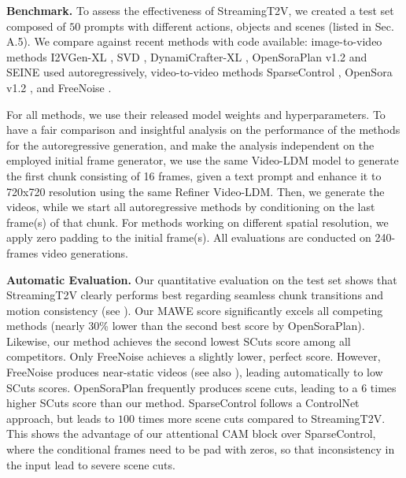 

\noindent\textbf{Benchmark.}
To assess the effectiveness of StreamingT2V, we created a test set composed of $50$ prompts with different actions, objects and scenes 
(listed in Sec. \textcolor{linkblue}{A.5}).
We compare against recent methods with code available: image-to-video methods I2VGen-XL  \cite{2023i2vgenxl}, SVD \cite{SVD}, DynamiCrafter-XL \cite{xing2023dynamicrafter}, OpenSoraPlan v1.2  \cite{opensoraplan} and SEINE \cite{chen2023seine} used autoregressively, video-to-video methods SparseControl  \cite{guo2023sparsectrl}, OpenSora v1.2 \cite{opensora}, and FreeNoise  \cite{qiu2023freenoise}.

For all methods, we use their released model weights and hyperparameters. 
To have a fair comparison and insightful analysis on the performance of the methods for the autoregressive generation, and make the analysis independent on the employed initial frame generator, we use the same Video-LDM model to generate the first chunk consisting of 16 frames, given a text prompt and enhance it to 720x720 resolution using the same Refiner Video-LDM.  
Then, we generate the videos, while we start all autoregressive methods by conditioning on the last frame(s) of that chunk. 
For methods working on different spatial resolution, we apply zero padding to the initial frame(s). All evaluations are conducted on 240-frames video generations. 


\noindent\textbf{Automatic Evaluation.} 
Our quantitative evaluation on the test set shows that StreamingT2V clearly performs best regarding seamless chunk transitions and motion consistency (see ). Our MAWE score significantly excels all competing methods  (\eg nearly 30\% lower than the second best score by OpenSoraPlan). 
Likewise, our method achieves the second lowest SCuts score among all competitors. Only  FreeNoise achieves a slightly lower, perfect score. However, FreeNoise produces near-static videos (see also ), leading automatically  to low SCuts scores. OpenSoraPlan frequently produces scene cuts, leading to a 6 times higher SCuts score than our method. SparseControl follows a ControlNet approach, but leads to $100$ times more scene cuts compared to StreamingT2V. This shows the advantage of our attentional CAM block over SparseControl,  
where the conditional frames need to be pad with zeros, so that inconsistency in the input lead to severe scene cuts. 

